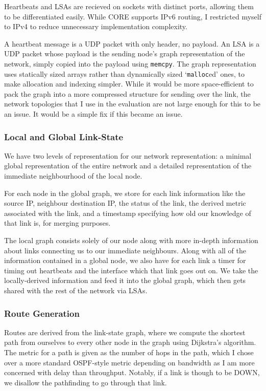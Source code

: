 \documentclass[10pt,twoside,a4paper]{article}
\begin{document}
Heartbeats and LSAs are recieved on sockets with distinct ports, allowing them to be differentiated easily. While CORE supports IPv6 routing, I restricted myself to IPv4 to reduce unnecessary implementation complexity.

A heartbeat message is a UDP packet with only header, no payload. An LSA is a UDP packet whose payload is the sending node's graph representation of the network, simply copied into the payload using \texttt{memcpy}. The graph representation uses statically sized arrays rather than dynamically sized `\texttt{malloc}ed' ones, to make allocation and indexing simpler. While it would be more space-efficient to pack the graph into a more compressed structure for sending over the link, the network topologies that I use in the evaluation are not large enough for this to be an issue. It would be a simple fix if this became an issue.

\subsubsection{Local and Global Link-State}

We have two levels of representation for our network representation: a minimal global representation of the entire network and a detailed representation of the immediate neighbourhood of the local node.

For each node in the global graph, we store for each link information like the source IP, neighbour destination IP, the status of the link, the derived metric associated with the link, and a timestamp specifying how old our knowledge of that link is, for merging purposes.

The local graph consists solely of our node along with more in-depth information about links connecting us to our immediate neighbours. Along with all of the information contained in a global node, we also have for each link a timer for timing out heartbeats and the interface which that link goes out on. We take the locally-derived information and feed it into the global graph, which then gets shared with the rest of the network via LSAs.

\subsubsection{Route Generation}

Routes are derived from the link-state graph, where we compute the shortest path from ourselves to every other node in the graph using Dijkstra's algorithm. The metric for a path is given as the number of hops in the path, which I chose over a more standard OSPF-style metric depending on bandwidth as I am more concerned with delay than throughput. Notably, if a link is though to be DOWN, we disallow the pathfinding to go through that link.
\end{document}
